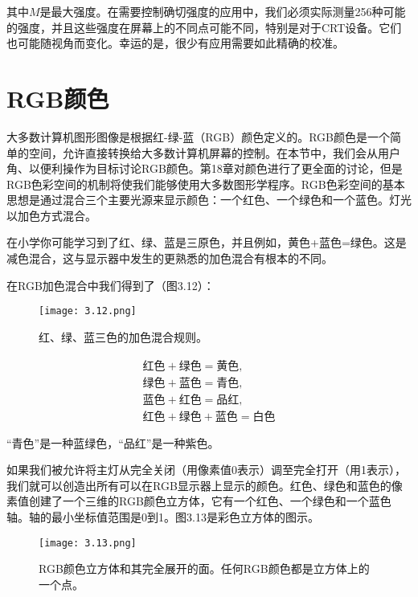 \documentclass[lang=cn,12pt]{elegantbook}
\begin{document}
其中$M$是最大强度。在需要控制确切强度的应用中，我们必须实际测量256种可能的强度，并且这些强度在屏幕上的不同点可能不同，特别是对于CRT设备。它们也可能随视角而变化。幸运的是，很少有应用需要如此精确的校准。

\section{RGB颜色}

大多数计算机图形图像是根据红-绿-蓝（RGB）颜色定义的。RGB颜色是一个简单的空间，允许直接转换给大多数计算机屏幕的控制。在本节中，我们会从用户角、以便利操作为目标讨论RGB颜色。第18章对颜色进行了更全面的讨论，但是RGB色彩空间的机制将使我们能够使用大多数图形学程序。RGB色彩空间的基本思想是通过混合三个主要光源来显示颜色：一个红色、一个绿色和一个蓝色。灯光以加色方式混合。

\begin{note}
  在小学你可能学习到了红、绿、蓝是三原色，并且例如，黄色+蓝色=绿色。这是减色混合，这与显示器中发生的更熟悉的加色混合有根本的不同。
\end{note}

在RGB加色混合中我们得到了（图3.12）：

\begin{figure}[htb]
  \centering
  \texttt{[image: 3.12.png]}
  \caption{红、绿、蓝三色的加色混合规则。}
\end{figure}

\[
  \begin{aligned}
    \mbox{红色} + \mbox{绿色} = \mbox{黄色}, \\
    \mbox{绿色} + \mbox{蓝色} = \mbox{青色}, \\
    \mbox{蓝色} + \mbox{红色} = \mbox{品红}, \\
    \mbox{红色} + \mbox{绿色} + \mbox{蓝色} = \mbox{白色}
  \end{aligned}
\]

“青色”是一种蓝绿色，“品红”是一种紫色。

如果我们被允许将主灯从完全关闭（用像素值0表示）调至完全打开（用1表示），我们就可以创造出所有可以在RGB显示器上显示的颜色。红色、绿色和蓝色的像素值创建了一个三维的RGB颜色立方体，它有一个红色、一个绿色和一个蓝色轴。轴的最小坐标值范围是0到1。图3.13是彩色立方体的图示。

\begin{figure}[htb]
  \centering
  \texttt{[image: 3.13.png]}
  \caption{RGB颜色立方体和其完全展开的面。任何RGB颜色都是立方体上的一个点。}
\end{figure}
\end{document}
